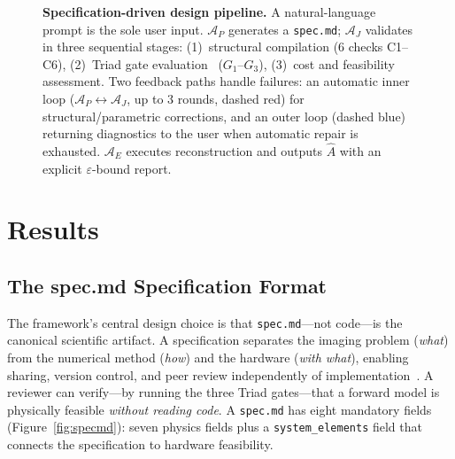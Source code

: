 \documentclass[11pt,a4paper]{article}
\newcommand{\eps}{\varepsilon}
\newcommand{\Agent}{\mathcal{A}}
\begin{document}
\begin{figure}[htbp]
{\begin{tikzpicture}
\end{tikzpicture}%
}
\caption{\textbf{Specification-driven design pipeline.}
A natural-language prompt is the sole user input.
$\Agent_P$ generates a \texttt{spec.md}; $\Agent_J$ validates in three sequential stages:
(1)~structural compilation (6 checks C1--C6),
(2)~Triad gate evaluation~\cite{paperII} ($G_1$--$G_3$),
(3)~cost and feasibility assessment.
Two feedback paths handle failures: an automatic inner loop ($\Agent_P \leftrightarrow \Agent_J$, up to 3 rounds, dashed red) for structural/parametric corrections, and an outer loop (dashed blue) returning diagnostics to the user when automatic repair is exhausted.
$\Agent_E$ executes reconstruction and outputs $\hat{A}$ with an explicit $\eps$-bound report.}
\label{fig:pipeline}
\end{figure}

\section{Results}

\subsection{The spec.md Specification Format}
\label{sec:specmd}

The framework's central design choice is that \texttt{spec.md}---not code---is the canonical scientific artifact.  A specification separates the imaging problem (\emph{what}) from the numerical method (\emph{how}) and the hardware (\emph{with what}), enabling sharing, version control, and peer review independently of implementation~\cite{wilkinson2016fair}.  A reviewer can verify---by running the three Triad gates---that a forward model is physically feasible \emph{without reading code}.  A \texttt{spec.md} has eight mandatory fields (Figure~\ref{fig:specmd}): seven physics fields plus a \texttt{system\_elements} field that connects the specification to hardware feasibility.
\end{document}
